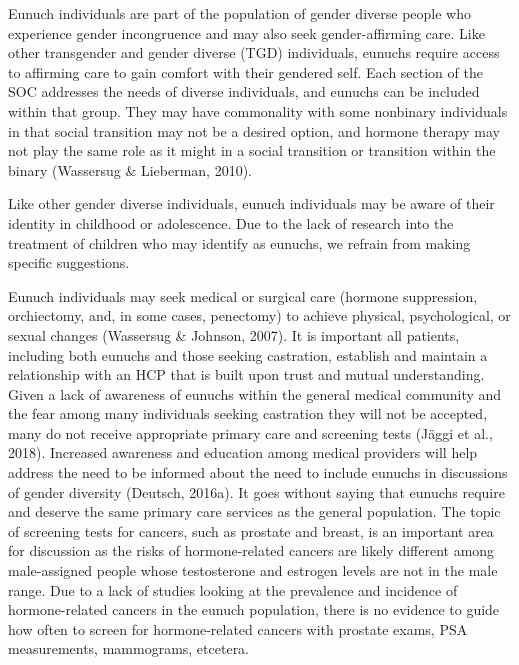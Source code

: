 \documentclass[
]{book}
\begin{document}
Eunuch individuals are part of the population
of gender diverse people who experience gender
incongruence and may also seek gender-affirming
care. Like other transgender and gender diverse
(TGD) individuals, eunuchs require access to
affirming care to gain comfort with their gendered self. Each section of the SOC addresses
the needs of diverse individuals, and eunuchs
can be included within that group. They may
have commonality with some nonbinary individuals in that social transition may not be a
desired option, and hormone therapy may not
play the same role as it might in a social transition or transition within the binary (Wassersug
\& Lieberman, 2010).

Like other gender diverse individuals, eunuch
individuals may be aware of their identity in
childhood or adolescence. Due to the lack of
research into the treatment of children who may
identify as eunuchs, we refrain from making specific suggestions.

Eunuch individuals may seek medical or surgical care (hormone suppression, orchiectomy,
and, in some cases, penectomy) to achieve physical, psychological, or sexual changes (Wassersug
\& Johnson, 2007). It is important all patients,
including both eunuchs and those seeking castration, establish and maintain a relationship with
an HCP that is built upon trust and mutual
understanding. Given a lack of awareness of
eunuchs within the general medical community
and the fear among many individuals seeking
castration they will not be accepted, many do
not receive appropriate primary care and screening tests (Jäggi et al., 2018). Increased awareness
and education among medical providers will help
address the need to be informed about the need
to include eunuchs in discussions of gender
diversity (Deutsch, 2016a). It goes without saying
that eunuchs require and deserve the same primary care services as the general population. The
topic of screening tests for cancers, such as prostate and breast, is an important area for
discussion as the risks of hormone-related cancers
are likely different among male-assigned people
whose testosterone and estrogen levels are not in
the male range. Due to a lack of studies looking
at the prevalence and incidence of hormone-related
cancers in the eunuch population, there is no
evidence to guide how often to screen for
hormone-related cancers with prostate exams,
PSA measurements, mammograms, etcetera.
\end{document}
